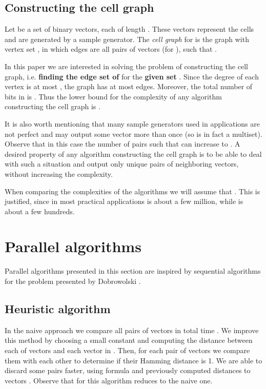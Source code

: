 \documentclass[a4paper]{article}
\begin{document}
\subsection{Constructing the cell graph}
Let  be a set of  binary vectors, each of length . These vectors represent the cells and are generated by a sample generator.
The {\em cell graph}  for  is the graph with vertex set , in which edges are all pairs of vectors  (for ), such that .

In this paper we are interested in solving the problem of constructing the cell graph, i.e. \textbf{finding the edge set of } for the \textbf{given set }.
Since the degree of each vertex is at most , the graph  has at most  edges. Moreover, the total number of bits in  is .  Thus the lower bound for the complexity of any algorithm constructing the cell graph is .

It is also worth mentioning that many sample generators used in applications are not perfect and may output some vector more than once (so  is in fact a multiset). Observe that in this case the number of pairs  such that  can  increase to .
A desired property of any algorithm constructing the cell graph is to be able to deal with such a situation and output only unique pairs of neighboring vectors, without increasing the complexity.

When comparing the complexities of the algorithms we will assume that . This is justified, since in most practical applications  is about a few million, while  is about a few hundreds.

\section{Parallel  algorithms} \label{sec:parallel}

Parallel algorithms presented in this section are inspired by sequential algorithms for the problem presented by Dobrowolski \cite{DBLP:conf/sii/Dobrowolski13}. 

\subsection{Heuristic algorithm}

In the naive approach we compare all pairs of vectors in total time  \cite{DBLP:conf/sii/Dobrowolski13}. We improve this method by choosing a small constant  and computing the distance between each of vectors  and each vector in .
Then, for each pair of vectors we compare them with each other to determine if their Hamming distance is 1. We are able to discard some pairs faster, using formula  and previously computed distances to vectors . Observe that for  this algorithm reduces to the naive one.
\end{document}
